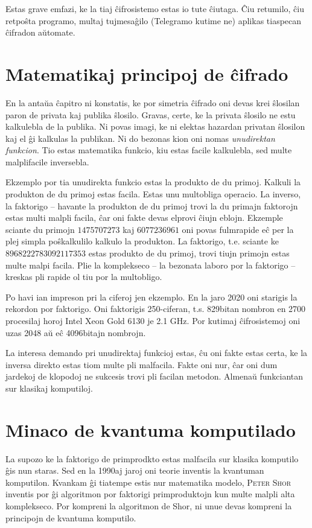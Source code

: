\documentclass[utf8]{scrartcl}
\begin{document}
Estas grave emfazi, ke la tiaj ĉifrosistemo estas io tute ĉiutaga. Ĉiu
retumilo, ĉiu retpoŝta programo, multaj tujmesaĝilo (Telegramo kutime ne)
aplikas tiaspecan ĉifradon aŭtomate.


\section{Matematikaj principoj de ĉifrado}

En la antaŭa ĉapitro ni konstatis, ke por simetria ĉifrado oni devas krei
ŝlosilan paron de privata kaj publika ŝlosilo.  Gravas, certe, ke la privata
ŝlosilo ne estu kalkulebla de la publika. Ni povas imagi, ke ni elektas
hazardan privatan ŝlosilon kaj el ĝi kalkulas la publikan. Ni do bezonas kion
oni nomas \emph{unudirektan funkcion}.  Tio estas matematika funkcio, kiu estas
facile kalkulebla, sed multe malplifacile inversebla.

Ekzemplo por tia unudirekta funkcio estas la produkto de du primoj.  Kalkuli la
produkton de du primoj estas facila. Estas unu multobliga operacio.  La
inverso, la faktorigo – havante la produkton de du primoj trovi la du primajn
faktorojn estas multi malpli facila, ĉar oni fakte devas elprovi ĉiujn eblojn.
Ekzemple sciante du primojn $1475707273$ kaj $6077236961$ oni povas fulmrapide
eĉ per la plej simpla poŝkalkulilo kalkulo la produkton. La faktorigo,
t.e. sciante ke $8968222783092117353$ estas produkto de du primoj, trovi tiujn
primojn estas multe malpi facila. Plie la komplekseco – la bezonata laboro por
la faktorigo – kreskas pli rapide ol tiu por la multobligo.

Po havi ian impreson pri la ciferoj jen ekzemplo. En la jaro 2020 oni starigis
la rekordon por faktorigo. Oni faktorigis 250-ciferan, t.s. 829bitan nombron en
2700 procesilaj horoj Intel Xeon Gold 6130 je 2.1 GHz.  Por kutimaj
ĉifrosistemoj oni uzas 2048 aŭ eĉ 4096bitajn nombrojn.

La interesa demando pri unudirektaj funkcioj estas, ĉu oni fakte estas certa,
ke la inversa direkto estas tiom multe pli malfacila. Fakte oni nur, ĉar oni
dum jardekoj de klopodoj ne sukcesis trovi pli facilan metodon.  Almenaŭ
funkciantan sur klasikaj komputiloj.


\section{Minaco de kvantuma komputilado}

La supozo ke la faktorigo de primprodkto estas malfacila sur klasika komputilo
ĝis nun staras.  Sed en la 1990aj jaroj oni teorie inventis la kvantuman
komputilon.  Kvankam ĝi tiatempe estis nur matematika modelo, \textsc{Peter
  Shor} inventis por ĝi algoritmon por faktorigi primproduktojn kun multe
malpli alta komplekseco.  Por kompreni la algoritmon de Shor, ni unue devas
kompreni la principojn de kvantuma komputilo.
\end{document}
